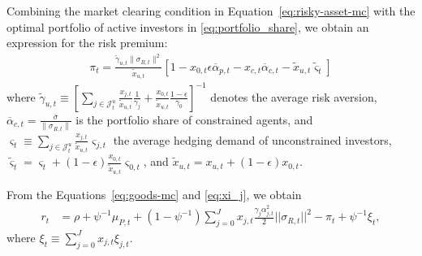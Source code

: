 \documentclass[12pt,english]{article}
\begin{document}
Combining the market clearing condition in Equation~\eqref{eq:risky-asset-mc} with the optimal portfolio of active investors in \eqref{eq:portfolio_share}, we obtain an expression for the risk premium:
\begin{align} \label{eq:sharpe_ratio}
	\pi_{t} =  \frac{\tilde{\gamma}_{u,t} \|\sigma_{R,t}\|^2}{\tilde{x}_{u,t}} \left[ 1 - x_{0,t} \epsilon \overline{\alpha}_{p,t} - x_{c,t} \overline{\alpha}_{c,t} - \tilde{x}_{u,t} \tilde{\varsigma}_{t} \right]
\end{align}
where $\tilde{\gamma}_{u,t} \equiv \left[ \sum_{j\in\mathcal{J}_t^u} \frac{x_{j,t}}{\tilde{x}_{u,t}} \frac{1}{\gamma_j}+\frac{x_{0,t}}{\tilde{x}_{u,t}} \frac{1-\epsilon}{\gamma_0} \right]^{-1}$ denotes the average risk aversion, $ \overline{\alpha}_{c,t}=\frac{\overline{\sigma}}{\|\sigma_{R,t}\|} $ is the portfolio share of constrained agents, and $\varsigma_t \equiv \sum_{j\in \mathcal{J}_t^u} \frac{x_{j,t}}{\tilde{x}_{u,t}} \varsigma_{j,t} $ the average hedging demand of unconstrained investors, $\tilde{\varsigma}_t = \varsigma_t + (1-\epsilon) \frac{x_{0,t}}{\tilde{x}_{u,t}} \varsigma_{0,t}$, and $\tilde{x}_{u,t} = x_{u,t} + (1-\epsilon) x_{0,t}$. 


From the Equations~\eqref{eq:goods-mc} and \eqref{eq:xi_j}, we obtain
\begin{align}\label{eq:interest_rate}
	r_t  &  =  \rho  +\psi^{-1} \mu_{P,t} + \left (1-\psi^{-1}\right )  \sum_{j=0}^J x_{j,t}\frac{\gamma_j \alpha_{j,t}^2}{2} ||\sigma_{R,t}||^2- \pi_t +\psi^{-1} \xi_t,
\end{align}
where $\xi_t \equiv \sum_{j=0}^J x_{j,t} \xi_{j,t}$.

\end{document}
